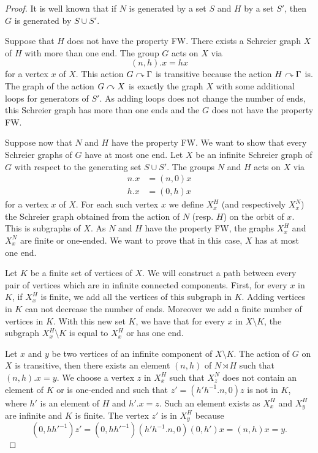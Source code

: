 \begin{proof}
It is well known that if $N$ is generated by a set $S$ and $H$ by a set $S'$, then $G$ is generated by $S \cup S'$.

Suppose that $H$ does not have the property FW. There exists a Schreier graph $X$ of $H$ with more than one end. The group $G$ acts on $X$ via 
\begin{equation*}
(n,h).x = hx 
\end{equation*}
for a vertex $x$ of $X$. This action $G \curvearrowright \Gamma$ is transitive because the action $H \curvearrowright \Gamma$ is. The graph of the action $G \curvearrowright X$ is exactly the graph $X$ with some additional loops for generators of $S'$. As adding loops does not change the number of ends, this Schreier graph has more than one ends and the $G$ does not have the property FW.

Suppose now that $N$ and $H$ have the property FW. We want to show that every Schreier graphs of $G$ have at most one end. Let $X$ be an infinite Schreier graph of $G$ with respect to the generating set $S \cup S'$. The groups $N$ and $H$ acts on $X$ via
\begin{align*}
n.x &= (n,0)x \\
h.x &= (0,h)x
\end{align*}
for a vertex $x$ of $X$. For each such vertex $x$ we define $X_x^H$ (and respectively $X_x^N$) the Schreier graph obtained from the action of $N$ (resp. $H$) on the orbit of $x$. This is subgraphs of $X$. As $N$ and $H$ have the property FW, the graphs $X_x^H$ and $X_x^N$ are finite or one-ended. We want to prove that in this case, $X$ has at most one end. 

Let $K$ be a finite set of vertices of $X$. We will construct a path between every pair of vertices which are in infinite connected components. First, for every $x$ in $K$, if $X_x^H$ is finite, we add all the vertices of this subgraph in $K$. Adding vertices in $K$ can not decrease the number of ends. Moreover we add a finite number of vertices in $K$. With this new set $K$, we have that for every $x$ in $X \setminus K$, the subgraph $X_x^H \setminus K$ is equal to $X_x^H$ or has one end. 

Let $x$ and $y$ be two vertices of an infinite component of $X \setminus K$. The action of $G$ on $X$ is transitive, then there exists an element $(n,h)$ of $N \rtimes H$ such that $(n,h).x = y$. We choose a vertex $z$ in $X_x^H$ such that $X_z^N$ does not contain an element of $K$ or is one-ended and such that $z'=(h'h^{-1}.n,0)z$ is not in $K$, where $h'$ is an element of $H$ and $h'.x = z$. Such an element exists as $X_x^H$ and $X_y^H$ are infinite and $K$ is finite. The vertex $z'$ is in $X_y^H$ because
\begin{equation*}
(0,hh'^{-1}) z' = (0,hh'^{-1})(h'h^{-1}.n,0)(0,h')x = (n,h)x = y.
\end{equation*}


\end{proof}
